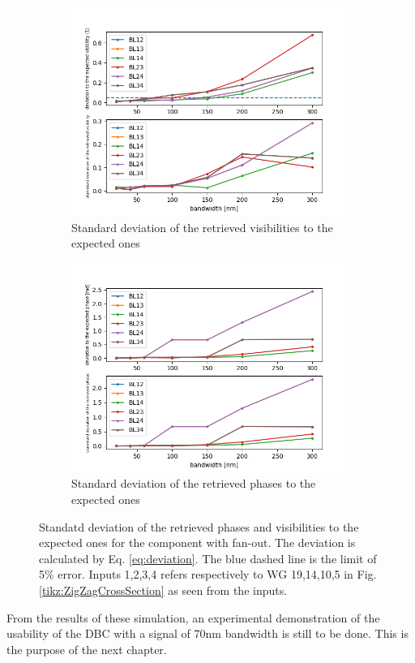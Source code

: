 \begin{figure}[htbp]
    \centering
    \begin{subfigure}{.45\textwidth}
        \includegraphics[scale=.45]{picture/retrieval_simu/visi_retrieved_fan.png}
        \caption{Standard deviation  of the retrieved visibilities to the expected ones}
    \end{subfigure}%
    \begin{subfigure}{.45\textwidth}
    \includegraphics[scale=.45]{picture/retrieval_simu/phase_retrieved_fan.png}
    \caption{Standard deviation of the retrieved phases to the expected ones}
    \end{subfigure}
    \caption{Standatd deviation of the retrieved phases and visibilities to the expected ones for the component with fan-out. The deviation is calculated by Eq. \ref{eq:deviation}. The blue dashed line is the limit of 5\% error. Inputs 1,2,3,4 refers respectively to WG 19,14,10,5 in Fig.\ref{tikz:ZigZagCrossSection} as seen from the inputs.}
    \label{fig:retrieved_fan}
\end{figure}

From the results of these simulation, an experimental demonstration of the usability of the DBC with a signal of 70nm bandwidth is still to be done. This is the purpose of the next chapter.

